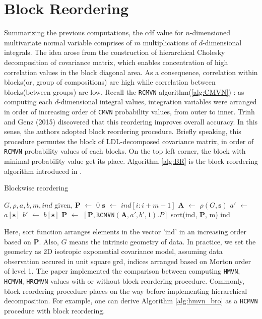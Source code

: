 \section{Block Reordering}

Summarizing the previous computations, the cdf value for $n$-dimensioned multivariate normal variable comprises of $m$ multiplications of $d$-dimensional integrals. The idea arose from the construction of hierarchical Cholesky decomposition of covariance matrix, which enables concentration of high correlation values in the block diagonal area. As a consequence, correlation within blocks(or, group of compositions) are high while correlation between blocks(between groups) are low. Recall the \texttt{RCMVN} algorithm(\ref{alg:CMVN}) : as computing each $d$-dimensional integral values, integration variables were arranged in order of increasing order of \texttt{CMVN} probability values, from outer to inner. Trinh and Genz (2015) discovered that this reordering improves overall accuracy. In this sense, the authors adopted block reordering procedure. Briefly speaking, this procedure permutes the block of LDL-decomposed covariance matrix, in order of \texttt{RCMVN} probability values of each blocks. On the top left corner, the block with minimal probability value get its place. Algorithm \ref{alg:BR} is the block reordering algorithm introduced in \citet{cao2019hierarchical}.

\begin{algorithm}[ht]
    \caption{Blockwise reordering}
	\begin{algorithmic}[1]
            \State $G, \rho, a, b, m, ind$ given, $\mathbf{P}$ $\leftarrow$ $0$
                \State $\mathbf{s}$ $\leftarrow$ $ind[i:i+m-1]$
                \State $\mathbf{A}$ $\leftarrow$ $\rho(G, \mathbf{s})$
                \State $a'$ $\leftarrow$ $a[\mathbf{s}]$
                \State $b'$ $\leftarrow$ $b[\mathbf{s}]$
                \State $\mathbf{P}$ $\leftarrow$ $[\mathbf{P}, \texttt{RCMVN}(\mathbf{A},a',b',1).P]$
            \EndFor
            \State sort(ind, $\mathbf{P}$, m)
            \State \Return ind
        \EndProcedure
    \end{algorithmic}\label{alg:BR}
\end{algorithm}

Here, sort function arranges elements in the vector 'ind' in an increasing order based on $\mathbf{P}$. Also, $G$ means the intrinsic geometry of data. In practice, we set the geometry as 2D isotropic exponential covariance model, assuming data observation occured in unit square grd, indices arranged based on Morton order of level 1. The paper implemented the comparison between computing \texttt{HMVN}, \texttt{HCMVN}, \texttt{HRCMVN} values with or without block reordering procedure. Commonly, block reordering procedure places on the way before implementing hierarchical decomposition. For example, one can derive Algorithm \ref{alg:hmvn_bro} as a \texttt{HCMVN} procedure with block reordering.


